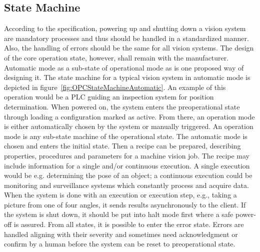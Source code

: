 \subsection{State Machine}
According to the specification, powering up and shutting down a vision system are mandatory processes and thus should be handled in a standardized manner. Also, the handling of errors should be the same for all vision systems. The design of the core operation state, however, shall remain with the manufacturer. Automatic mode as a sub-state of operational mode as is one proposed way of designing it. The state machine for a typical vision system in automatic mode is depicted in figure~\ref{fig:OPCStateMachineAutomatic}. An example of this operation would be a PLC guiding an inspection system for position determination. When powered on, the system enters the preoperational state through loading a configuration marked as active. From there, an operation mode is either automatically chosen by the system or manually triggered. An operation mode is any sub-state machine of the operational state. The automatic mode is chosen and enters the initial state. Then a recipe can be prepared, describing properties, procedures and parameters for a machine vision job. The recipe may include information for a single and/or continuous execution. A single execution would be e.g. determining the pose of an object; a continuous execution could be monitoring and surveillance systems which constantly process and acquire data. When the system is done with an execution or execution step, e.g., taking a picture from one of four angles, it sends results asynchronously to the client. If the system is shut down, it should be put into halt mode first where a safe power-off is assured. From all states, it is possible to enter the error state. Errors are handled aligning with their severity and sometimes need acknowledgment or confirm by a human before the system can be reset to preoperational state.

